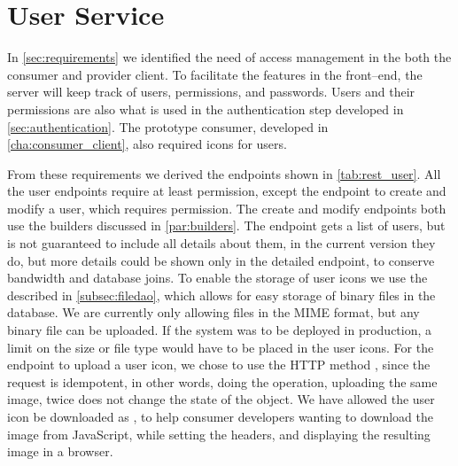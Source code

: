\section{User Service}\label{sec:userservice}

In \cref{sec:requirements} we identified the need of access management in the
both the consumer and provider client. To facilitate the features in the
front--end, the server will keep track of users, permissions, and passwords.
Users and their permissions are also what is used in the authentication step
developed in \cref{sec:authentication}. The prototype consumer, developed in
\cref{cha:consumer_client}, also required icons for users.


From these requirements we derived the endpoints shown in \cref{tab:rest_user}.
All the user endpoints require at least  permission, except the
endpoint to create and modify a user, which requires 
permission. The create and modify endpoints both use the builders discussed in
\cref{par:builders}. The  endpoint gets a list of users,
but is not guaranteed to include all details about them, in the current version
they do, but more details could be shown only in the detailed 
endpoint, to conserve bandwidth and database joins. To enable the storage of
user icons we use the  described in \cref{subsec:filedao},
which allows for easy storage of binary files in the database. We are currently
only allowing files in the  \ac{MIME} format, but any binary
file can be uploaded.  If the system was to be deployed in production, a limit
on the size or file type would have to be placed in the user icons. For the
endpoint to upload a user icon, we chose to use the HTTP method ,
since the request is idempotent, in other words, doing the operation, uploading
the same image, twice does not change the state of the object. We have allowed
the user icon be downloaded as , to help consumer developers
wanting to download the image from JavaScript, while setting the headers, and
displaying the resulting image in a browser.

